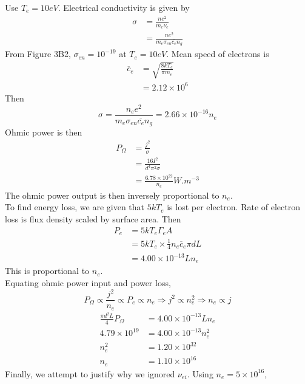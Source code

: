 \documentclass[answers]{exam}
\begin{document}
\begin{questions}
\begin{parts}
\begin{solution}
    Use $T_e = 10\unit{eV}$. Electrical conductivity is given by
    \begin{align*}
        \sigma &= \frac{ne^2}{m_e\nu_e} \\
               &= \frac{ne^2}{m_e\sigma_{en}\overline{c_e}n_g}
    \end{align*}
    From Figure 3B2, $\sigma_{en} = 10^{-19}$ at $T_e = 10\unit{eV}$. Mean speed of electrons is
    \begin{align*}
        \overline c_e &= \sqrt{\frac{8kT_e}{\pi m_e}} \\
                      &= 2.12 \times 10^6
    \end{align*}
    Then
    $$\sigma = \frac{n_e e^2}{m_e\sigma_{en}\overline{c_e} n_g} = 2.66 \times 10^{-16}n_e$$
    Ohmic power is then
    \begin{align*}
        P_\Omega &= \frac{j^2}{\sigma} \\
                 &= \frac{16I^2}{d^4\pi^2\sigma} \\
                 &= \frac{6.78 \times 10^{22}}{n_e} \unit{W.m^{-3}}
    \end{align*}
    The ohmic power output is then inversely proportional to $n_e$. \\
    To find energy loss, we are given that $5kT_e$ is lost per electron. Rate of electron loss is flux density scaled by surface area. Then
    \begin{align*}
        P_e &= 5kT_e\Gamma_e A \\
            &= 5kT_e \times \frac{1}{4} n_e\overline c_e \pi dL \\
            &= 4.00 \times 10^{-13}Ln_e
    \end{align*}
    This is proportional to $n_e$. \\
    Equating ohmic power input and power loss,
    $$P_\Omega \propto \frac{j^2}{n_e} \propto P_e \propto n_e \Rightarrow j^2 \propto n_e^2 \Rightarrow n_e \propto j$$
    \begin{align*}
        \frac{\pi d^2L}{4} P_\Omega &= 4.00 \times 10^{-13}Ln_e \\
        4.79 \times 10^{19} &= 4.00 \times 10^{-13}n_e^2 \\
        n_e^2 &= 1.20 \times 10^{32} \\
        n_e &= 1.10 \times 10^{16}
    \end{align*}
    Finally, we attempt to justify why we ignored $\nu_{ei}$. Using $n_e = 5 \times 10^{16}$,
    \begin{align*}

\end{align*}
\end{solution}
\end{parts}
\end{questions}
\end{document}

